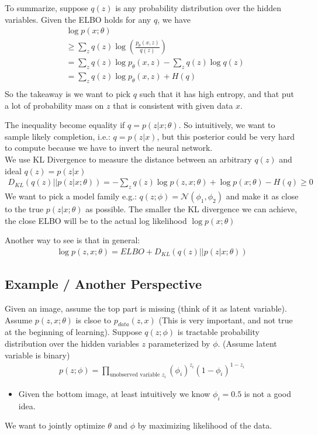 To summarize, suppose $q(z)$ is any probability distribution over the hidden variables. Given the ELBO holds for any $q$, we have         
    \begin{align*}
        & \log p(x;\theta) \\
        & \geq \sum_z q(z) \log (\frac{p_\theta(x,z) }{q(z)}) \tag{Empirical estimation using monte carlo}\\
        & = \sum_z q(z) \log p_\theta(x,z) - \sum_z q(z) \log q(z)\\
        & = \sum_z q(z) \log p_\theta(x,z) + H(q) \tag{ELBO}\\
    \end{align*}
So the takeaway is we want to pick $q$ such that it has high entropy, and that put a lot of probability mass on $z$ that is consistent with given data $x$. \\ \par
The inequality become equality if $q = p(z|x; \theta)$. So intuitively, we want to sample likely completion, i.e.: $q = p(z|x)$, but this posterior could be very hard to compute because we have to invert the neural network. \\
We use KL Divergence to measure the distance between an arbitrary $q(z)$ and ideal $q(z) = p(z|x)$
    \begin{align*}
        D_{KL}(q(z)||p(z|x;\theta)) = -\sum_z q(z) \log p(z,x;\theta) + \log p(x;\theta) - H(q) \geq 0
    \end{align*}
We want to pick a model family e.g.: $q(z;\phi) = \mathcal{N}(\phi_1, \phi_2)$ and make it as close to the true $p(z|x;\theta)$ as possible. The smaller the KL divergence we can achieve, the close ELBO will be to the actual log likelihood $\log p(x;\theta)$\\ \par

Another way to see is that in general: 
    \begin{align*}
        \log p(z,x;\theta) = ELBO + D_{KL}(q(z)||p(z|x;\theta))
    \end{align*}

\subsection{Example / Another Perspective}
Given an image, assume the top part is missing (think of it as latent variable). Assume $p(z,x;\theta)$ is clsoe to $p_{data}(z,x)$ (This is very important, and not true at the beginning of learning). Suppose $q(z;\phi)$ is tractable probability distribution over the hidden variables $z$ parameterized by $\phi$. (Assume latent variable is binary)
    \begin{align*}
        p(z;\phi) = \prod_{\textrm{unobserved variable $z_i$}} (\phi_i)^{z_i}(1-\phi_i)^{1-z_i}
    \end{align*}
    \begin{itemize}
        \item Given the bottom image, at least intuitively we know $\phi_i=0.5$ is not a good idea. 
    \end{itemize}
We want to jointly optimize $\theta$ and $\phi$ by maximizing likelihood of the data. 


